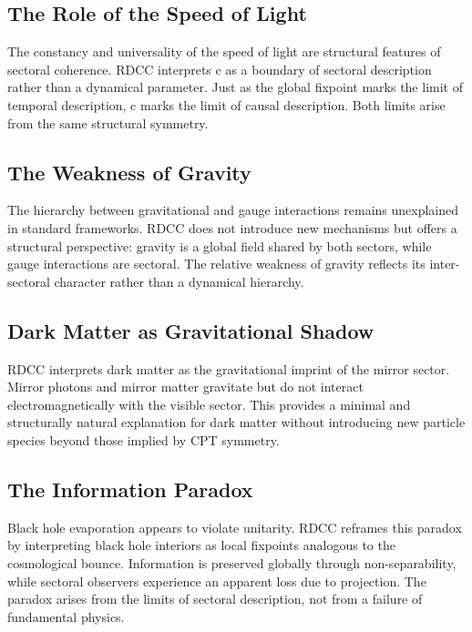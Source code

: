 \documentclass[11pt,a4paper]{article}
\begin{document}
\subsection{The Role of the Speed of Light}

The constancy and universality of the speed of light are structural features of sectoral coherence. RDCC interprets c as a boundary of sectoral description rather than a dynamical parameter. Just as the global fixpoint marks the limit of temporal description, c marks the limit of causal description. Both limits arise from the same structural symmetry.

\subsection{The Weakness of Gravity}

The hierarchy between gravitational and gauge interactions remains unexplained in standard frameworks. RDCC does not introduce new mechanisms but offers a structural perspective: gravity is a global field shared by both sectors, while gauge interactions are sectoral. The relative weakness of gravity reflects its inter-sectoral character rather than a dynamical hierarchy.

\subsection{Dark Matter as Gravitational Shadow}

RDCC interprets dark matter as the gravitational imprint of the mirror sector. Mirror photons and mirror matter gravitate but do not interact electromagnetically with the visible sector. This provides a minimal and structurally natural explanation for dark matter without introducing new particle species beyond those implied by CPT symmetry.

\subsection{The Information Paradox}

Black hole evaporation appears to violate unitarity. RDCC reframes this paradox by interpreting black hole interiors as local fixpoints analogous to the cosmological bounce. Information is preserved globally through non-separability, while sectoral observers experience an apparent loss due to projection. The paradox arises from the limits of sectoral description, not from a failure of fundamental physics.
\end{document}
